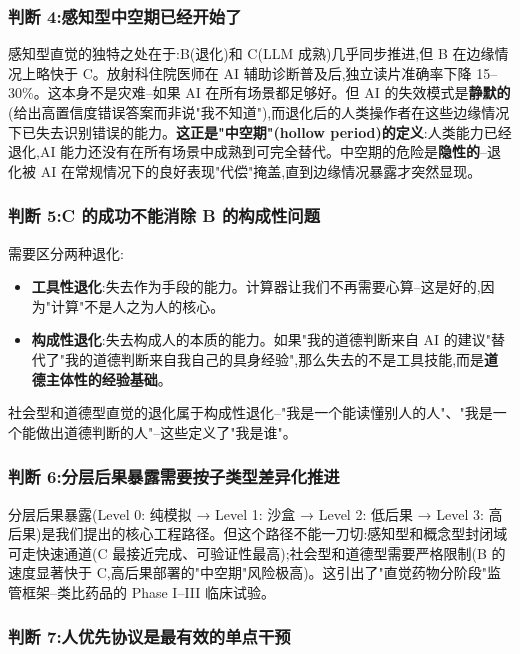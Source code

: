 \documentclass[11pt,a4paper]{article}
\begin{document}
\subsubsection{判断 4:感知型中空期已经开始了}

感知型直觉的独特之处在于:B(退化)和 C(LLM 成熟)几乎同步推进,但 B 在边缘情况上略快于 C。放射科住院医师在 AI 辅助诊断普及后,独立读片准确率下降 15--30\%\cite{jama2023}。这本身不是灾难--如果 AI 在所有场景都足够好。但 AI 的失效模式是\textbf{静默的}(给出高置信度错误答案而非说"我不知道"),而退化后的人类操作者在这些边缘情况下已失去识别错误的能力。\textbf{这正是"中空期"(hollow period)的定义}:人类能力已经退化,AI 能力还没有在所有场景中成熟到可完全替代。中空期的危险是\textbf{隐性的}--退化被 AI 在常规情况下的良好表现"代偿"掩盖,直到边缘情况暴露才突然显现。

\subsubsection{判断 5:C 的成功不能消除 B 的构成性问题}

需要区分两种退化:
\begin{itemize}
  \item \textbf{工具性退化}:失去作为手段的能力。计算器让我们不再需要心算--这是好的,因为"计算"不是人之为人的核心。
  \item \textbf{构成性退化}:失去构成人的本质的能力。如果"我的道德判断来自 AI 的建议"替代了"我的道德判断来自我自己的具身经验",那么失去的不是工具技能,而是\textbf{道德主体性的经验基础}。
\end{itemize}

社会型和道德型直觉的退化属于构成性退化--"我是一个能读懂别人的人"、"我是一个能做出道德判断的人"--这些定义了"我是谁"\cite{jennings2025moral}。

\subsubsection{判断 6:分层后果暴露需要按子类型差异化推进}

分层后果暴露(Level 0: 纯模拟 → Level 1: 沙盒 → Level 2: 低后果 → Level 3: 高后果)是我们提出的核心工程路径。但这个路径不能一刀切:感知型和概念型封闭域可走快速通道(C 最接近完成、可验证性最高);社会型和道德型需要严格限制(B 的速度显著快于 C,高后果部署的"中空期"风险极高)。这引出了"直觉药物分阶段"监管框架--类比药品的 Phase I--III 临床试验。

\subsubsection{判断 7:人优先协议是最有效的单点干预}
\end{document}
